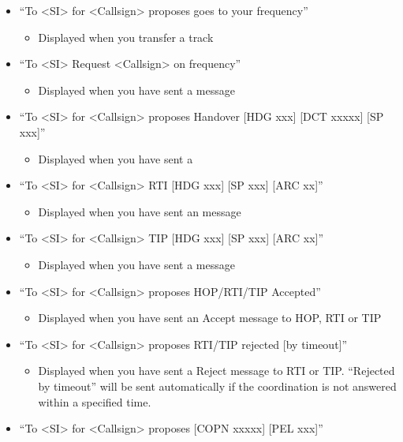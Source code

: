 \documentclass[a4paper,oneside,11pt]{memoir}
\begin{document}
\begin{itemize}
    \item“To <SI> for <Callsign> proposes goes to your frequency”
        \begin{itemize}
             \item Displayed when you transfer a track
        \end{itemize}
    \item“To <SI> Request <Callsign> on frequency”
        \begin{itemize}
             \item Displayed when you have sent a  message
        \end{itemize}
    \item“To <SI> for <Callsign> proposes Handover [HDG xxx] [DCT xxxxx] [SP xxx]”
        \begin{itemize}
             \item Displayed when you have sent a 
        \end{itemize}
    \item“To <SI> for <Callsign> RTI [HDG xxx] [SP xxx] [ARC xx]”
        \begin{itemize}
             \item Displayed when you have sent an  message
        \end{itemize}
    \item“To <SI> for <Callsign> TIP [HDG xxx] [SP xxx] [ARC xx]”
        \begin{itemize}
             \item Displayed when you have sent a  message
        \end{itemize}
    \item“To <SI> for <Callsign> proposes HOP/RTI/TIP Accepted”
        \begin{itemize}
             \item Displayed when you have sent an Accept message to HOP, RTI or TIP
        \end{itemize}
    \item“To <SI> for <Callsign> proposes RTI/TIP rejected [by timeout]”
        \begin{itemize}
             \item Displayed when you have sent a Reject message to RTI or TIP. “Rejected by timeout” will be sent automatically if the coordination is not answered within a specified time.
        \end{itemize}
    \item“To <SI> for <Callsign> proposes [COPN xxxxx] [PEL xxx]”

\end{itemize}
\end{document}
